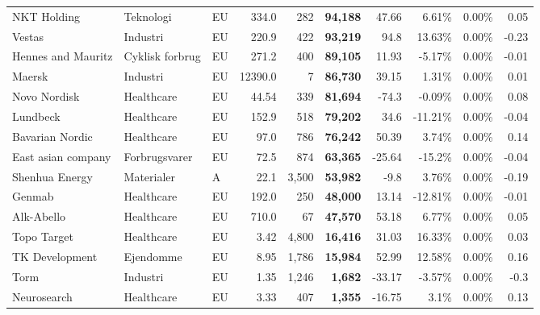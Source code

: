 \begin{tabular}{lllrrrrrrr}
NKT Holding & Teknologi & EU & 334.0 & 282 & \bf{94,188} & 47.66 & 6.61\% & 0.00\% & 0.05\\
Vestas & Industri & EU & 220.9 & 422 & \bf{93,219} & 94.8 & 13.63\% & 0.00\% & -0.23\\
Hennes and Mauritz & Cyklisk forbrug & EU & 271.2 & 400 & \bf{89,105} & 11.93 & -5.17\% & 0.00\% & -0.01\\
Maersk & Industri & EU & 12390.0 & 7 & \bf{86,730} & 39.15 & 1.31\% & 0.00\% & 0.01\\
Novo Nordisk & Healthcare & EU & 44.54 & 339 & \bf{81,694} & -74.3 & -0.09\% & 0.00\% & 0.08\\
Lundbeck & Healthcare & EU & 152.9 & 518 & \bf{79,202} & 34.6 & -11.21\% & 0.00\% & -0.04\\
Bavarian Nordic & Healthcare & EU & 97.0 & 786 & \bf{76,242} & 50.39 & 3.74\% & 0.00\% & 0.14\\
East asian company & Forbrugsvarer & EU & 72.5 & 874 & \bf{63,365} & -25.64 & -15.2\% & 0.00\% & -0.04\\
Shenhua Energy & Materialer & A & 22.1 & 3,500 & \bf{53,982} & -9.8 & 3.76\% & 0.00\% & -0.19\\
Genmab & Healthcare & EU & 192.0 & 250 & \bf{48,000} & 13.14 & -12.81\% & 0.00\% & -0.01\\
Alk-Abello & Healthcare & EU & 710.0 & 67 & \bf{47,570} & 53.18 & 6.77\% & 0.00\% & 0.05\\
Topo Target & Healthcare & EU & 3.42 & 4,800 & \bf{16,416} & 31.03 & 16.33\% & 0.00\% & 0.03\\
TK Development & Ejendomme & EU & 8.95 & 1,786 & \bf{15,984} & 52.99 & 12.58\% & 0.00\% & 0.16\\
Torm & Industri & EU & 1.35 & 1,246 & \bf{1,682} & -33.17 & -3.57\% & 0.00\% & -0.3\\
Neurosearch & Healthcare & EU & 3.33 & 407 & \bf{1,355} & -16.75 & 3.1\% & 0.00\% & 0.13\\
\bottomrule

\end{tabular}